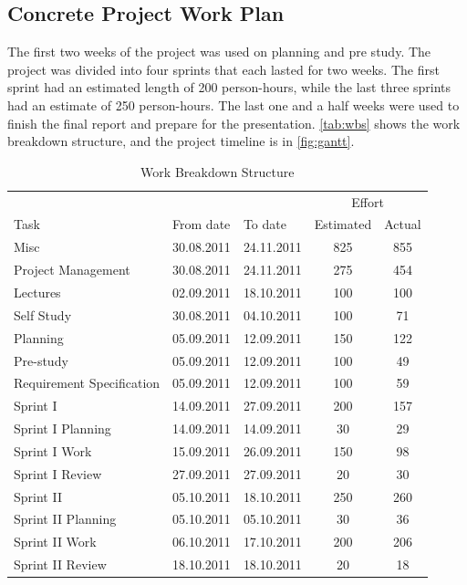 \subsection{Concrete Project Work Plan}
The first two weeks of the project was used on planning and pre study.
The project was divided into four sprints that each lasted for two weeks.
The first sprint had an estimated length of 200 person-hours, while the last three
sprints had an estimate of 250 person-hours. The last one and a half weeks were used to finish
the final report and prepare for the presentation. \autoref{tab:wbs} shows the
work breakdown structure, and the project timeline is in \autoref{fig:gantt}.

\begin{table}[!htb] \footnotesize \center
\caption{Work Breakdown Structure\label{tab:wbs}}
\begin{tabular}{l l l c c}
	\toprule
	& & & \multicolumn{2}{c}{Effort} \\
	\cmidrule(r){4-5}
	Task & From date & To date & Estimated & Actual  \\
	\midrule
	Misc & 30.08.2011 & 24.11.2011 & 825 & 855  \\
	\midrule
	Project Management & 30.08.2011 & 24.11.2011 & 275 & 454 \\
	Lectures & 02.09.2011 & 18.10.2011 & 100 & 100 \\
	Self Study & 30.08.2011 & 04.10.2011 & 100 & 71 \\
	Planning & 05.09.2011 & 12.09.2011 & 150 & 122 \\
	Pre-study & 05.09.2011 & 12.09.2011 & 100 & 49 \\
	Requirement Specification & 05.09.2011 & 12.09.2011 & 100 & 59 \\
	\midrule
	Sprint I & 14.09.2011 & 27.09.2011 & 200 & 157 \\
	\midrule
	Sprint I Planning & 14.09.2011 & 14.09.2011 & 30 & 29 \\
	Sprint I Work & 15.09.2011 & 26.09.2011 & 150 & 98 \\
	Sprint I Review & 27.09.2011 & 27.09.2011 & 20 & 30 \\
	\midrule
	Sprint II & 05.10.2011 & 18.10.2011 & 250 & 260 \\
	\midrule
	Sprint II Planning & 05.10.2011 & 05.10.2011 & 30 & 36 \\
	Sprint II Work & 06.10.2011 & 17.10.2011 & 200 & 206 \\
	Sprint II Review & 18.10.2011 & 18.10.2011 & 20 & 18 \\

\end{tabular}
\end{table}
